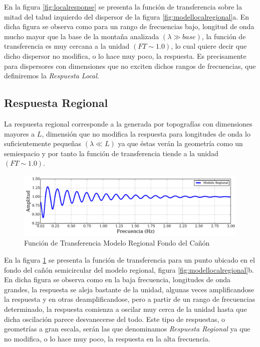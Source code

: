\documentclass[spanish,letterpaper,12pt,twoside,openany]{article}
\begin{document}
En la figura \ref{fig:localresponse} se presenta la función de transferencia sobre la mitad del talud izquierdo del dispersor de la figura \ref{fig:modellocalregional}a. En dicha figura se observa como para un rango de frecuencias bajo, longitud de onda mucho mayor que la base de la montaña analizada $\left( \lambda \gg base \right)$, la función de transferencia es muy cercana a la unidad $\left( FT\sim 1.0 \right)$, lo cual quiere decir que dicho dispersor no modifica, o lo hace muy poco, la respuesta. Es precisamente para dispersores con dimensiones que no exciten dichos rangos de frecuencias, que definiremos la \textit{Respuesta Local}.

\subsection{Respuesta Regional}

La respuesta regional corresponde a la generada por topografías con dimensiones mayores a $L$, dimensión que no modifica la respuesta para longitudes de onda lo suficientemente pequeñas $\left( \lambda \ll L \right)$ ya que éstas verán la geometría como un semiespacio y por tanto la función de transferencia tiende a la unidad $\left( FT \sim 1.0 \right)$.

\begin{figure}[H]
	\centering
	\includegraphics[width=15.5 cm]{img/RegionalResponse.pdf}
	\vspace{-1 cm}
	\caption{Función de Transferencia Modelo Regional Fondo del Cañón}
	\label{fig:regionalresponse}
	\vspace{-1 cm}
\end{figure}

En la figura \ref{fig:regionalresponse} se presenta la función de transferencia para un punto ubicado en el fondo del cañón semicircular del modelo regional, figura \ref{fig:modellocalregional}b. En dicha figura se observa como en la baja frecuencia, longitudes de onda grandes, la respuesta se aleja bastante de la unidad, algunas veces amplificandose la respuesta y en otras deamplificandose, pero a partir de un rango de frecuencias determinado, la respuesta comienza a oscilar muy cerca de la unidad hasta que dicha oscilación parece desvanecerse del todo. Este tipo de respuestas, o geometrías a gran escala, serán las que denominamos \textit{Respuesta Regional} ya que no modifica, o lo hace muy poco, la respuesta en la alta frecuencia.
%
%
%
%
%
\end{document}
